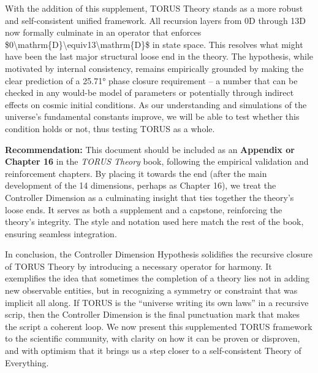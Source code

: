 \documentclass[]{article}
\begin{document}
With the addition of this supplement, TORUS Theory stands as a more
robust and self-consistent unified framework. All recursion layers from
0D through 13D now formally culminate in an operator that enforces
\$0\textbackslash{}mathrm\{D\}\textbackslash{}equiv13\textbackslash{}mathrm\{D\}\$
in state space. This resolves what might have been the last major
structural loose end in the theory. The hypothesis, while motivated by
internal consistency, remains empirically grounded by making the clear
prediction of a 25.71° phase closure requirement -- a number that can be
checked in any would-be model of parameters or potentially through
indirect effects on cosmic initial conditions. As our understanding and
simulations of the universe's fundamental constants improve, we will be
able to test whether this condition holds or not, thus testing TORUS as
a whole.

\textbf{Recommendation:} This document should be included as an
\textbf{Appendix or Chapter 16} in the \emph{TORUS Theory} book,
following the empirical validation and reinforcement chapters. By
placing it towards the end (after the main development of the 14
dimensions, perhaps as Chapter 16), we treat the Controller Dimension as
a culminating insight that ties together the theory's loose ends. It
serves as both a supplement and a capstone, reinforcing the theory's
integrity. The style and notation used here match the rest of the book,
ensuring seamless integration.

In conclusion, the Controller Dimension Hypothesis solidifies the
recursive closure of TORUS Theory by introducing a necessary operator
for harmony. It exemplifies the idea that sometimes the completion of a
theory lies not in adding new observable entities, but in recognizing a
symmetry or constraint that was implicit all along. If TORUS is the
``universe writing its own laws'' in a recursive scrip​, then the
Controller Dimension is the final punctuation mark that makes the script
a coherent loop. We now present this supplemented TORUS framework to the
scientific community, with clarity on how it can be proven or disproven,
and with optimism that it brings us a step closer to a self-consistent
Theory of Everything.
\end{document}
